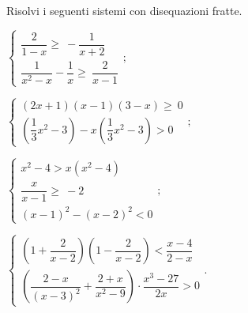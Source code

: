 \begin{esercizio}[\Ast]
\label{ese:18.74}
Risolvi i seguenti sistemi con disequazioni fratte.
\begin{multicols}{2}
\begin{enumeratea}{\longarray
 \item $\left\{\begin{array}{l}
		\dfrac{2}{1-x}\ge~-\dfrac{1}{x+2}\\
		\dfrac{1}{x^{2}-x}-\dfrac{1}{x}\ge~\dfrac{2}{x-1}
	\end{array}\right.;$
\item $\left\{\begin{array}{l}
        (2x+1)(x-1)(3-x)\ge~0\\
        \left(\dfrac{1}{3}x^{2}-3\right)-x\left(\dfrac{1}{3}x^{2}-3\right)>0
       \end{array}\right.;$
\item $\left\{\begin{array}{l}
	   x^{2}-4>x\left(x^{2}-4\right)\\
	   \dfrac{x}{x-1}\ge~-2\\
	   (x-1)^{2}-(x-2)^{2}<0
	   \end{array}\right.;$
\item $\left\{\begin{array}{l}
	   \left(1+\dfrac{2}{x-2}\right)\left(1-\dfrac{2}{x-2}\right)<\dfrac{x-4}{2-x}\\
	   \left(\dfrac{2-x}{(x-3)^{2}}+\dfrac{2+x}{x^{2}-9}\right)\cdot{\dfrac{x^{3}-27}{2x}}>0
	   \end{array}\right..$}
\end{enumeratea}
\end{multicols}

\end{esercizio}

